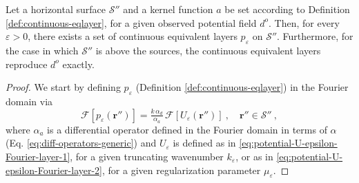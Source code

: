 \begin{theorem}
	\label{theorem:planar-eqlayer-theorem}
	Let a horizontal surface $\mathcal{S}''$ and a kernel function $a$ 
	be set according to Definition \ref{def:continuous-eqlayer}, for a given observed potential field $d^{o}$. 
	Then, for every $\varepsilon > 0$, there exists a set of continuous equivalent layers $p_{\varepsilon}$ on $\mathcal{S}''$. 
	Furthermore, for the case in which $\mathcal{S}''$ is above the sources, the continuous equivalent layers 
	reproduce $d^{o}$ exactly.
\end{theorem}
\begin{proof}
	We start by defining $p_{\varepsilon}$ (Definition \ref{def:continuous-eqlayer}) 
	in the Fourier domain via
	\begin{equation}
		\mathcal{F} [ p_{\varepsilon}(\mathbf{r}'') ] =
		\tfrac{k \, \alpha_{d}}{\alpha_{a}} \,
		\mathcal{F} [ U_{\varepsilon}(\mathbf{r}'') ] \: ,
		\quad \mathbf{r}'' \in \mathcal{S}'' \: ,
		\label{eq:p-Fourier}
	\end{equation}
	where $\alpha_{a}$ is a differential operator 
	defined in the Fourier domain in terms of $\alpha$ (Eq. \ref{eq:diff-operators-generic}) and
	$U_{\varepsilon}$ is defined as in \ref{eq:potential-U-epsilon-Fourier-layer-1},
	for a given truncating wavenumber $k_{\varepsilon}$, or as in \ref{eq:potential-U-epsilon-Fourier-layer-2},
	for a given regularization parameter $\mu_{\varepsilon}$. 
	

\end{proof}

